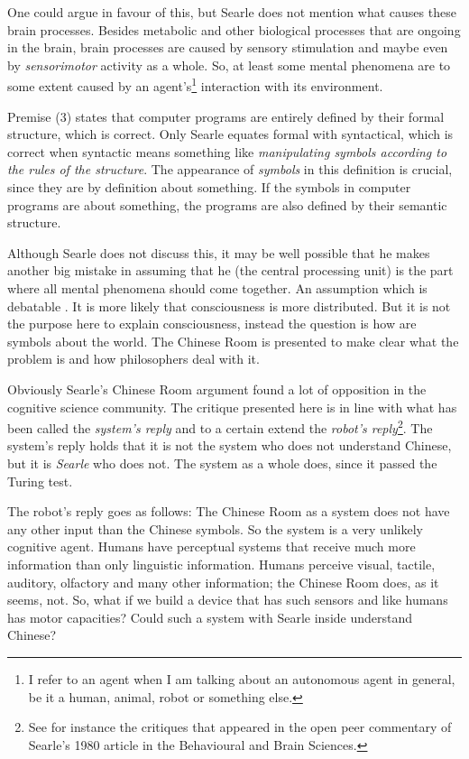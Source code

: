 One could argue in favour of this, but Searle does not mention what causes these brain processes. Besides metabolic and other biological processes that are ongoing in the brain, brain processes are caused by sensory stimulation and maybe even by {\em sensorimotor} activity as a whole. So, at least some mental phenomena are to some extent caused by an agent's\footnote{I refer to an agent when I am talking about an autonomous agent in general, be it a human, animal, robot or something else.} interaction with its environment.

Premise (3) states that computer programs are entirely defined by their formal structure, which is correct. Only Searle equates formal with syntactical, which is correct when syntactic means something like {\em manipulating symbols according to the rules of the structure}. The appearance of {\em symbols} in this definition is crucial, since they are by definition about something. If the symbols in computer programs are about something, the programs are also defined by their semantic structure.

Although Searle does not discuss this, it may be well possible that he makes another big mistake in assuming that he (the central processing unit) is the part where all mental phenomena should come together. An assumption which is debatable \citep[see, e.g., ][]{dennett:1991,edelman:1992}. It is more likely that consciousness is more distributed. But it is not the purpose here to explain consciousness, instead the question is how are symbols about the world. The Chinese Room is presented to make clear what the problem is and how philosophers deal with it.

Obviously Searle's Chinese Room argument found a lot of opposition in the cognitive science community. The critique presented here is in line with what has been called the {\em system's reply} and to a certain extend the {\em robot's reply}\footnote{See for instance the critiques that appeared in the open peer commentary of Searle's 1980 article in the Behavioural and Brain Sciences.}. The system's reply holds that it is not the system who does not understand Chinese, but it is {\em Searle} who does not. The system as a whole does, since it passed the Turing test. 

The robot's reply goes as follows: The Chinese Room as a system does not have any other input than the Chinese symbols. So the system is a very unlikely cognitive agent. Humans have perceptual systems that receive much more information than only linguistic information. Humans perceive visual, tactile, auditory, olfactory and many other information; the Chinese Room does, as it seems, not. So, what if we build a device that has such sensors and like humans has motor capacities? Could such a system with Searle inside understand Chinese?

